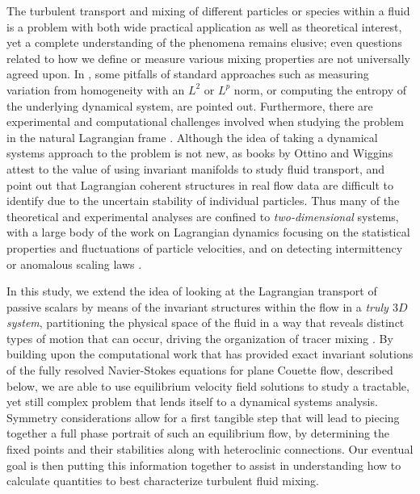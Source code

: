 \documentclass[letter,12pt,openany]{article}
\begin{document}
The turbulent transport and mixing of different particles or species 
within a fluid is a problem with both wide practical application as well 
as theoretical interest, yet a complete understanding of the phenomena 
remains elusive; even questions related to how we define or measure 
various mixing properties are not universally agreed upon. In 
\cite{MaMPe05}, some pitfalls of standard approaches such as measuring 
variation from homogeneity with an $L^2$ or $L^p$ norm, or computing the 
entropy of the underlying dynamical system, are pointed out. Furthermore, 
there are experimental and computational challenges involved when 
studying the problem in the natural Lagrangian frame 
\cite{MHPRS07,ABBBBB08,BrLiEc06,MoLePi04}. Although the idea of taking a 
dynamical systems approach to the problem is not new, as books by Ottino 
\cite{Botti89} and Wiggins \cite{Wiggins1992} attest to the value of
using invariant manifolds to study fluid transport, \cite{MHPRS07} and 
\cite{Haller02} point out that Lagrangian coherent structures in 
real flow data are difficult to identify due to the uncertain stability 
of individual particles. Thus many of the theoretical and experimental 
analyses are confined to \textit{two-dimensional} systems, with a large 
body of the work on Lagrangian dynamics focusing on the statistical 
properties and fluctuations of particle velocities, and on detecting 
intermittency or anomalous scaling laws 
\cite{EgeChi22,MoLePi04,ABBBBB08,FaGaVe01}. 

In this study, we extend the idea of looking at the Lagrangian transport 
of passive scalars by means of the invariant structures within the flow 
in a \textit{truly $3D$ system}, partitioning the physical space of the 
fluid in a way that reveals distinct types of motion that can occur, 
driving the organization of tracer mixing \cite{Haller02}. By building 
upon the computational work that has provided exact invariant solutions 
of the fully resolved Navier-Stokes equations for plane Couette flow, 
described below, we are able to use equilibrium velocity field solutions 
to study a tractable, yet still complex problem that lends itself to a 
dynamical systems analysis. Symmetry considerations allow for a first 
tangible step that will lead to piecing together a full phase portrait of 
such an equilibrium flow, by determining the fixed points and their 
stabilities along with heteroclinic connections.  Our eventual goal is 
then putting this information together to assist in understanding how to 
calculate quantities to best characterize turbulent fluid mixing. 
\end{document}
